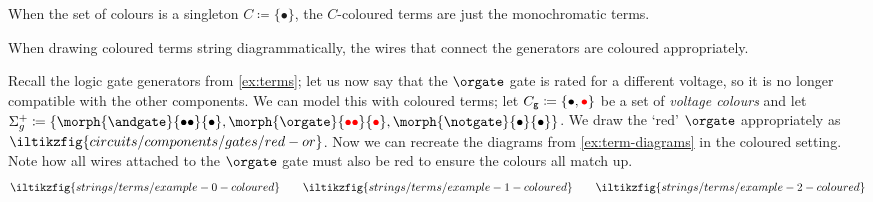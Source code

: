 \begin{remark}
    When the set of colours is a singleton \(C \coloneqq \{\bullet\}\), the
    \(C\)-coloured terms are just the monochromatic terms.
\end{remark}

When drawing coloured terms string diagrammatically, the wires that connect the
generators are coloured appropriately.

\begin{example}
    Recall the logic gate generators from \cref{ex:terms}; let us now say that
    the \(\orgate\) gate is rated for a different voltage, so it is no longer
    compatible with the other components.
    We can model this with coloured terms; let
    \(C_\mathsf{g} \coloneqq \{\bullet,\textcolor{red}{\bullet}\}\) be a set of
    \emph{voltage colours} and let \(
    \Sigma_g^+
    \coloneqq
    \{\morph{\andgate}{\bullet\bullet}{\bullet}, \morph{\orgate}{\redbullet\redbullet}{\redbullet}, \morph{\notgate}{\bullet}{\bullet}\}
    \).
    We draw the `red' \(\orgate\) appropriately as \(
    \iltikzfig{circuits/components/gates/red-or}
    \).
    Now we can recreate the diagrams from \cref{ex:term-diagrams} in the
    coloured setting.
    Note how all wires attached to the \(\orgate\) gate must also be red
    to ensure the colours all match up.
    \begin{gather*}
        \iltikzfig{strings/terms/example-0-coloured}
        \qquad
        \iltikzfig{strings/terms/example-1-coloured}
        \qquad
        \iltikzfig{strings/terms/example-2-coloured}
    \end{gather*}
\end{example}
